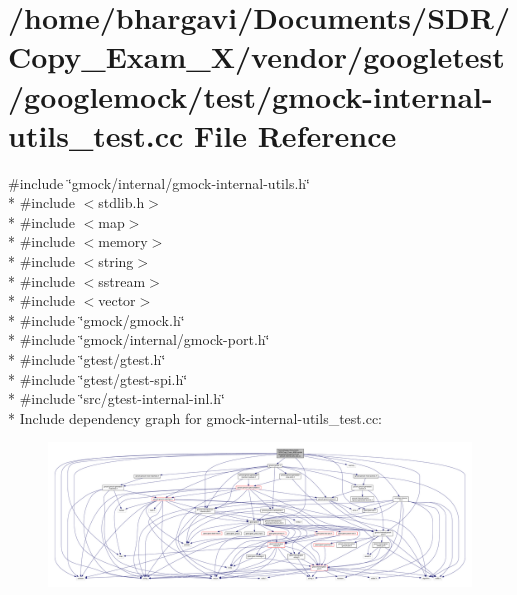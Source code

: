 \hypertarget{gmock-internal-utils__test_8cc}{}\section{/home/bhargavi/\+Documents/\+S\+D\+R/\+Copy\+\_\+\+Exam\+\_\+X/vendor/googletest/googlemock/test/gmock-\/internal-\/utils\+\_\+test.cc File Reference}
\label{gmock-internal-utils__test_8cc}
{\ttfamily \#include \char`\"{}gmock/internal/gmock-\/internal-\/utils.\+h\char`\"{}}\\*
{\ttfamily \#include $<$stdlib.\+h$>$}\\*
{\ttfamily \#include $<$map$>$}\\*
{\ttfamily \#include $<$memory$>$}\\*
{\ttfamily \#include $<$string$>$}\\*
{\ttfamily \#include $<$sstream$>$}\\*
{\ttfamily \#include $<$vector$>$}\\*
{\ttfamily \#include \char`\"{}gmock/gmock.\+h\char`\"{}}\\*
{\ttfamily \#include \char`\"{}gmock/internal/gmock-\/port.\+h\char`\"{}}\\*
{\ttfamily \#include \char`\"{}gtest/gtest.\+h\char`\"{}}\\*
{\ttfamily \#include \char`\"{}gtest/gtest-\/spi.\+h\char`\"{}}\\*
{\ttfamily \#include \char`\"{}src/gtest-\/internal-\/inl.\+h\char`\"{}}\\*
Include dependency graph for gmock-\/internal-\/utils\+\_\+test.cc\+:
\nopagebreak
\begin{figure}[H]
\begin{center}
\leavevmode
\includegraphics[width=350pt]{gmock-internal-utils__test_8cc__incl}
\end{center}
\end{figure}
